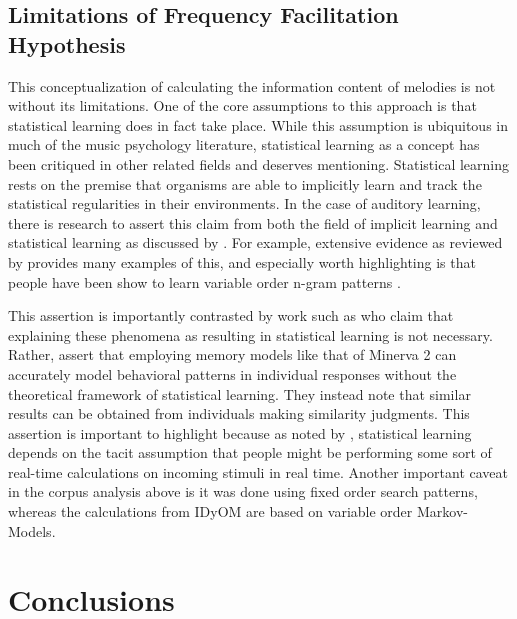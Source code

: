 \documentclass[12pt,]{book}
\begin{document}
\hypertarget{limitations-of-frequency-facilitation-hypothesis}{%
\subsection{Limitations of Frequency Facilitation Hypothesis}\label{limitations-of-frequency-facilitation-hypothesis}}

This conceptualization of calculating the information content of melodies is not without its limitations.
One of the core assumptions to this approach is that statistical learning does in fact take place.
While this assumption is ubiquitous in much of the music psychology literature, statistical learning as a concept has been critiqued in other related fields and deserves mentioning.
Statistical learning rests on the premise that organisms are able to implicitly learn and track the statistical regularities in their environments.
In the case of auditory learning, there is research to assert this claim from both the field of implicit learning and statistical learning as discussed by \citet{perruchetImplicitLearningStatistical2006}.
For example, extensive evidence as reviewed by \citet{cleeremansComputationalModelsImplicit2008} provides many examples of this, and especially worth highlighting is that people have been show to learn variable order n-gram patterns \citep{remillardImplicitLearningFirst2001}.

This assertion is importantly contrasted by work such as \citet{jamiesonApplyingExemplarModel2009} who claim that explaining these phenomena as resulting in statistical learning is not necessary.
Rather, \citet{jamiesonApplyingExemplarModel2009} assert that employing memory models like that of Minerva 2 can accurately model behavioral patterns in individual responses without the theoretical framework of statistical learning.
They instead note that similar results can be obtained from individuals making similarity judgments.
This assertion is important to highlight because as noted by \citet{perruchetImplicitLearningStatistical2006}, statistical learning depends on the tacit assumption that people might be performing some sort of real-time calculations on incoming stimuli in real time.
Another important caveat in the corpus analysis above is it was done using fixed order search patterns, whereas the calculations from IDyOM are based on variable order Markov-Models.

\hypertarget{conclusions-1}{%
\section{Conclusions}\label{conclusions-1}}
\end{document}
